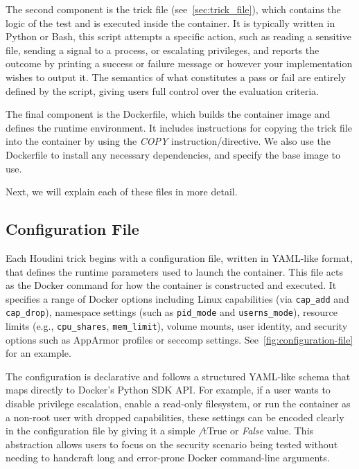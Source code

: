 \documentclass[12pt]{report}
\begin{document}
\begin{doublespace}
The second component is the trick file (see~\ref{sec:trick_file}), which contains the logic of the test and is executed inside the container. It is typically written in Python or Bash, this script attempts a specific action, such as reading a sensitive file, sending a signal to a process, or escalating privileges, and reports the outcome by printing a success or failure message or however your implementation wishes to output it. The semantics of what constitutes a pass or fail are entirely defined by the script, giving users full control over the evaluation criteria.

The final component is the Dockerfile, which builds the container image and defines the runtime environment. It includes instructions for copying the trick file into the container by using the \textit{COPY} instruction/directive. We also use the Dockerfile to install any necessary dependencies, and specify the base image to use.

Next, we will explain each of these files in more detail.

\subsection{Configuration File}
\label{sec:configuration}

Each Houdini trick begins with a configuration file, written in YAML-like format, that defines the runtime parameters used to launch the container. This file acts as the Docker command for how the container is constructed and executed. It specifies a range of Docker options including Linux capabilities (via \texttt{cap\_add} and \texttt{cap\_drop}), namespace settings (such as \texttt{pid\_mode} and \texttt{userns\_mode}), resource limits (e.g., \texttt{cpu\_shares}, \texttt{mem\_limit}), volume mounts, user identity, and security options such as AppArmor profiles or seccomp settings. See~\ref{fig:configuration-file} for an example.

The configuration is declarative and follows a structured YAML-like schema that maps directly to Docker’s Python SDK API. For example, if a user wants to disable privilege escalation, enable a read-only filesystem, or run the container as a non-root user with dropped capabilities, these settings can be encoded clearly in the configuration file by giving it a simple \textit/t{True} or \textit{False} value. This abstraction allows users to focus on the security scenario being tested without needing to handcraft long and error-prone Docker command-line arguments.


\end{doublespace}
\end{document}
